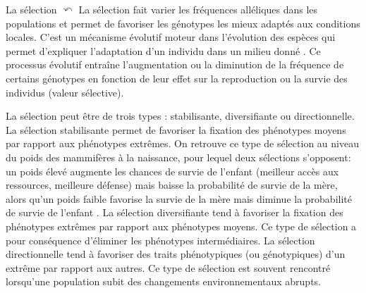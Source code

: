 \hypertarget{selec1}{}
\begin{encadre2}{La sélection}
  \hyperlink{selec2}{$\curvearrowleft$}
	La sélection fait varier les fréquences alléliques dans les populations et permet de favoriser  les génotypes les mieux  adaptés aux conditions locales. C'est un mécanisme évolutif moteur dans l'évolution des espèces qui permet d'expliquer l'adaptation d'un individu dans un milieu donné \citep{Darwin1859}.
Ce processus évolutif entraîne l’augmentation  ou la diminution  de la fréquence de certains génotypes  en fonction de leur effet sur la reproduction ou la survie des individus (valeur sélective).
	
	La sélection peut être de trois types : stabilisante, diversifiante ou directionnelle.
La sélection stabilisante permet de favoriser  la fixation des phénotypes moyens par rapport
aux phénotypes extrêmes. On retrouve ce type de sélection au niveau du poids des mammifères à la naissance,
pour lequel deux sélections s’opposent: un poids élevé augmente les chances de
survie  de l'enfant (meilleur accès aux ressources, meilleure défense) mais baisse la
probabilité de survie de la mère, alors qu’un poids faible favorise la survie de la
mère mais diminue la probabilité de survie de l’enfant \citep{Covas2002}.
La sélection diversifiante tend à favoriser la fixation des phénotypes extrêmes par
rapport aux phénotypes moyens. Ce type de sélection a pour conséquence d'éliminer les phénotypes intermédiaires.%
La sélection directionnelle tend à favoriser
des  traits phénotypiques (ou génotypiques) d'un extrême par rapport aux autres.
Ce type de sélection est souvent rencontré lorsqu’une population subit  des changements environnementaux abrupts.


\end{encadre2}
